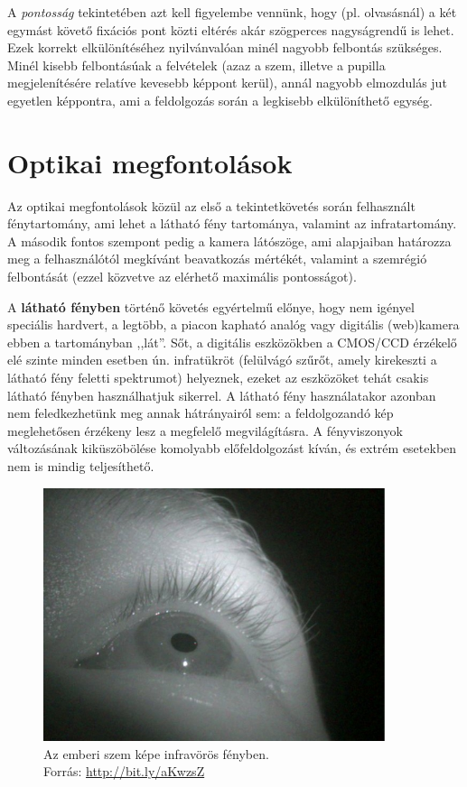 A \textit{pontosság} tekintetében azt kell figyelembe vennünk, hogy (pl. olvasásnál) a két egymást követő fixációs pont közti eltérés akár szögperces nagyságrendű is lehet. Ezek korrekt elkülönítéséhez nyilvánvalóan minél nagyobb felbontás szükséges. Minél kisebb felbontásúak a felvételek (azaz a szem, illetve a pupilla megjelenítésére relatíve kevesebb képpont kerül), annál nagyobb elmozdulás jut egyetlen képpontra, ami a feldolgozás során a legkisebb elkülöníthető egység.


\section{Optikai megfontolások}\label{sect:hw_optikai}

Az optikai megfontolások közül az első a tekintetkövetés során felhasznált fénytartomány, ami lehet a látható fény tartománya, valamint az infratartomány. A második fontos szempont pedig a kamera látószöge, ami alapjaiban határozza meg a felhasználótól megkívánt beavatkozás mértékét, valamint a szemrégió felbontását (ezzel közvetve az elérhető maximális pontosságot).

\bigskip

A \textbf{látható fényben} történő követés egyértelmű előnye, hogy nem igényel speciális hardvert, a legtöbb, a piacon kapható analóg vagy digitális (web)kamera ebben a tartományban ,,lát''. Sőt, a digitális eszközökben a CMOS/CCD érzékelő elé szinte minden esetben ún. infratükröt (felülvágó szűrőt, amely kirekeszti a látható fény feletti spektrumot) helyeznek, ezeket az eszközöket tehát csakis látható fényben használhatjuk sikerrel. A látható fény használatakor azonban nem feledkezhetünk meg annak hátrányairól sem: a feldolgozandó kép meglehetősen érzékeny lesz a megfelelő megvilágításra. A fényviszonyok változásának kiküszöbölése komolyabb előfeldolgozást kíván, és extrém esetekben nem is mindig teljesíthető.

\begin{figure}[!ht]
\centering
\includegraphics[width=100mm, keepaspectratio]{figures/infra_eye.png}
\caption{Az emberi szem képe infravörös fényben.\\Forrás: \url{http://bit.ly/aKwzsZ}}
\label{fig:eyepic}
\end{figure}

